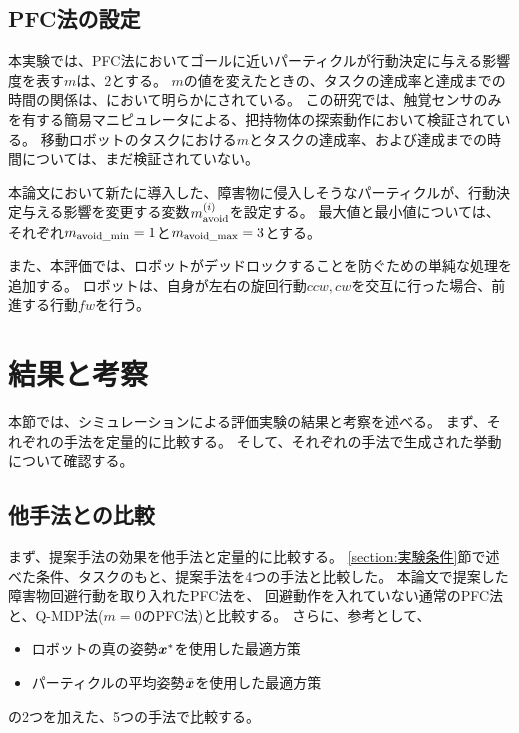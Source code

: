 \subsection{PFC法の設定}
本実験では、PFC法においてゴールに近いパーティクルが行動決定に与える影響度を表す$m$は、$2$とする。
$m$の値を変えたときの、タスクの達成率と達成までの時間の関係は、\cite{ueda2018searching}において明らかにされている。
この研究では、触覚センサのみを有する簡易マニピュレータによる、把持物体の探索動作において検証されている。
移動ロボットのタスクにおける$m$とタスクの達成率、および達成までの時間については、まだ検証されていない。

本論文において新たに導入した、障害物に侵入しそうなパーティクルが、行動決定与える影響を変更する変数$m^{(i)}_{\rm avoid}$を設定する。
最大値と最小値については、それぞれ$m_{\rm avoid\_min} = 1$と$m_{\rm avoid\_max} = 3$とする。

また、本評価では、ロボットがデッドロックすることを防ぐための単純な処理を追加する。
ロボットは、自身が左右の旋回行動$ccw, cw$を交互に行った場合、前進する行動$fw$を行う。


\section{結果と考察} \label{section:結果}
本節では、シミュレーションによる評価実験の結果と考察を述べる。
まず、それぞれの手法を定量的に比較する。
そして、それぞれの手法で生成された挙動について確認する。

\subsection{他手法との比較}
まず、提案手法の効果を他手法と定量的に比較する。
\ref{section:実験条件}節で述べた条件、タスクのもと、提案手法を4つの手法と比較した。
本論文で提案した障害物回避行動を取り入れたPFC法を、
回避動作を入れていない通常のPFC法と、Q-MDP法($m=0$のPFC法)と比較する。
さらに、参考として、
\begin{itemize}
  \item ロボットの真の姿勢$\boldsymbol{x}^{*}$を使用した最適方策
  \item パーティクルの平均姿勢$\bar{\boldsymbol{x}}$を使用した最適方策
\end{itemize}
の2つを加えた、5つの手法で比較する。

